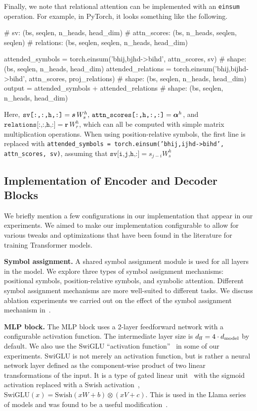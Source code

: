 Finally, we note that relational attention can be implemented with an \texttt{einsum} operation. For example, in PyTorch, it looks something like the following.
\begin{python}
# sv: (bs, seqlen, n_heads, head_dim)
# attn_scores: (bs, n_heads, seqlen, seqlen)
# relations: (bs, seqlen, seqlen, n_heads, head_dim)

attended_symbols = torch.einsum('bhij,bjhd->bihd', attn_scores, sv)
# shape: (bs, seqlen, n_heads, head_dim)
attended_relations = torch.einsum('bhij,bijhd->bihd', attn_scores, proj_relations)
# shape: (bs, seqlen, n_heads, head_dim)
output = attended_symbols + attended_relations
# shape: (bs, seqlen, n_heads, head_dim)
\end{python}

Here, $\texttt{sv[:,:,h,:]} = \bm{s} \,W_s^h,\, \texttt{attn\_scores[:,h,:,:]} = \bm{\alpha}^h$, and $\texttt{relations[:,:,h,:]} = \bm{r} \, W_r^h$, which can all be computed with simple matrix multiplication operations. When using position-relative symbols, the first line is replaced with \texttt{attended\_symbols = torch.einsum('bhij,ijhd->bihd', attn\_scores, sv)}, assuming that $\texttt{sv[i,j,h,:]} = s_{j-i} W_s^h$

\subsection{Implementation of Encoder and Decoder Blocks}

We briefly mention a few configurations in our implementation that appear in our experiments. We aimed to make our implementation configurable to allow for various tweaks and optimizations that have been found in the literature for training Transformer models.

\textbf{Symbol assignment.} A shared symbol assignment module is used for all layers in the model. We explore three types of symbol assignment mechanisms: positional symbols, position-relative symbols, and symbolic attention. Different symbol assignment mechanisms are more well-suited to different tasks. We discuss ablation experiments we carried out on the effect of the symbol assignment mechanism in~.

\textbf{MLP block.} The MLP block uses a 2-layer feedforward network with a configurable activation function. The intermediate layer size is $d_{\mathrm{ff}} = 4 \cdot d_{\mathrm{model}}$ by default. We also use the SwiGLU ``activation function''~\citep{shazeerGLUVariantsImprove2020} in some of our experiments. SwiGLU is not merely an activation function, but is rather a neural network layer defined as the component-wise product of two linear transformations of the input. It is a type of gated linear unit~\citep{dauphin2017language} with the sigmoid activation replaced with a Swish activation~\citep{hendrycks2016gaussian}, $\mathrm{SwiGLU}(x) = \mathrm{Swish}(x W + b) \otimes (x V + c)$. This is used in the Llama series of models and was found to be a useful modification~\citep{touvronLlamaOpenFoundation2023}.

